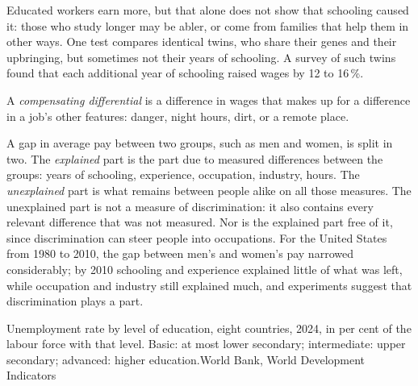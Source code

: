 Educated workers earn more, but that alone does not show that schooling caused it: those who study longer may be abler, or come from families that help them in other
ways. One test compares identical twins, who share their genes and their upbringing, but sometimes not their years of schooling. A survey of such twins found that each
additional year of schooling raised wages by 12 to 16\,\%.

\begin{definition}\label{def:g11:labour-market:compensating-differential}
A \emph{compensating differential} is a difference in wages that makes up for a difference in a job's other features: danger, night
hours, dirt, or a remote place.
\end{definition}

\begin{measure}
A gap in average pay between two groups, such as men and women, is split in two. The \emph{explained} part is the part due to measured differences between the groups:
years of schooling, experience, occupation, industry, hours. The \emph{unexplained} part is what remains between people alike on all those measures. The unexplained part
is not a measure of discrimination: it also contains every relevant difference that was not measured. Nor is the explained part free of it, since discrimination can
steer people into occupations. For the United States from 1980 to 2010, the gap between men's and women's pay narrowed considerably; by 2010 schooling and experience
explained little of what was left, while occupation and industry still explained much, and experiments suggest that discrimination plays a part.
\end{measure}

\begin{omchart}{Unemployment rate by level of education, eight countries, 2024, in per cent of the labour force with that level. Basic: at most lower secondary;
intermediate: upper secondary; advanced: higher education.}{World Bank, World Development Indicators}
\end{omchart}

